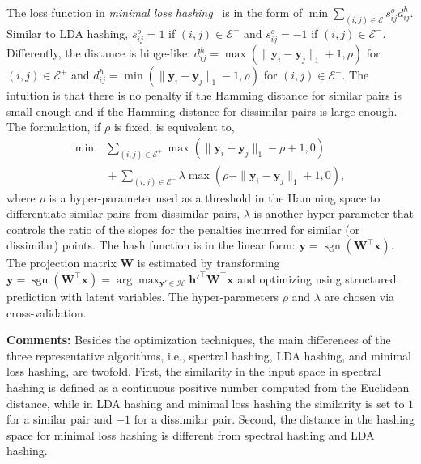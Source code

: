 \documentclass[10pt,journal,compsoc]{IEEEtran}
\begin{document}
The loss function in \emph{minimal loss hashing}~\cite{NorouziF11}
is in the form of $\operatorname{min} \sum_{(i,j) \in \mathcal{E}} s_{ij}^o d_{ij}^h$.
Similar to LDA hashing,
$s_{ij}^o = 1$ if $(i,j) \in \mathcal{E}^+$
and $s_{ij}^o = -1$ if $(i,j) \in \mathcal{E}^-$.
Differently,
the distance is hinge-like:
$d^h_{ij} = \max(\|\mathbf{y}_i - \mathbf{y}_j\|_1 + 1, \rho)$ for $(i,j) \in \mathcal{E}^+$
and
$d^h_{ij} = \min(\|\mathbf{y}_i - \mathbf{y}_j\|_1 - 1, \rho)$ for $(i,j) \in \mathcal{E}^-$.
The intuition is
that there is no penalty if the Hamming distance
for similar pairs is small enough
and if the Hamming distance for dissimilar pairs is large enough.
The formulation, if $\rho$ is fixed,
is equivalent to,
\begin{align}
\min &~\sum\nolimits_{(i,j) \in \mathcal{E}^+}  \max(\|\mathbf{y}_i - \mathbf{y}_j\|_1 - \rho + 1, 0) \nonumber \\
&~ + \sum\nolimits_{(i,j) \in \mathcal{E}^-}  \lambda \max(\rho - \|\mathbf{y}_i - \mathbf{y}_j\|_1 + 1, 0),
\end{align}
where $\rho$ is a hyper-parameter
used as a threshold
in the Hamming space
to differentiate similar pairs from dissimilar pairs,
$\lambda$ is another hyper-parameter
that controls the ratio
of the slopes
for the penalties
incurred for similar (or dissimilar) points.
The hash function is in the linear form:
$\mathbf{y} = \operatorname{sgn}(\mathbf{W}^\top\mathbf{x})$.
The projection matrix $\mathbf{W}$
is estimated
by transforming $\mathbf{y} = \operatorname{sgn}(\mathbf{W}^\top\mathbf{x}) = \arg\max_{\mathbf{y}' \in \mathcal{H}} \mathbf{h}'^\top\mathbf{W}^\top\mathbf{x}$
and optimizing using structured prediction with latent variables.
The hyper-parameters $\rho$ and $\lambda$ are chosen
via cross-validation.


\textbf{Comments:}
Besides the optimization techniques,
the main differences
of the three representative algorithms,
i.e., spectral hashing, LDA hashing, and minimal loss hashing,
are twofold.
First,
the similarity in the input space in spectral hashing
is defined as a continuous positive number
computed from the Euclidean distance,
while in LDA hashing and minimal loss hashing
the similarity is set to $1$ for a similar pair and $-1$ for a dissimilar pair.
Second,
the distance in the hashing space for minimal loss hashing
is different from spectral hashing and LDA hashing.
\end{document}
